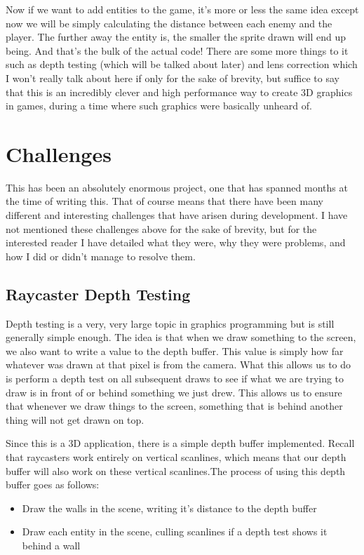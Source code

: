 \documentclass{article}
\begin{document}
Now if we want to add entities to the game, it's more or less the same idea
except now we will be simply calculating the distance between each enemy and the
player. The further away the entity is, the smaller the sprite drawn will end up
being. And that's the bulk of the actual code! There are some more things to it
such as depth testing (which will be talked about later) and lens correction
which I won't really talk about here if only for the sake of brevity, but
suffice to say that this is an incredibly clever and high performance way to
create 3D graphics in games, during a time where such graphics were basically
unheard of.

\section{Challenges}
This has been an absolutely enormous project, one that has spanned months at the
time of writing this. That of course means that there have been many different
and interesting challenges that have arisen during development. I have not
mentioned these challenges above for the sake of brevity, but for the interested
reader I have detailed what they were, why they were problems, and how I did or
didn't manage to resolve them.

\subsection{Raycaster Depth Testing}
Depth testing is a very, very large topic in graphics programming but is still
generally simple enough. The idea is that when we draw something to the screen,
we also want to write a value to the depth buffer. This value is simply how far
whatever was drawn at that pixel is from the camera. What this allows us to do
is perform a depth test on all subsequent draws to see if what we are trying to
draw is in front of or behind something we just drew. This allows us to ensure
that whenever we draw things to the screen, something that is behind another
thing will not get drawn on top.

Since this is a 3D application, there is a simple depth buffer implemented.
Recall that raycasters work entirely on vertical scanlines, which means that our
depth buffer will also work on these vertical scanlines.The process of using
this depth buffer goes as follows:

\begin{itemize}
    \item Draw the walls in the scene, writing it's distance to the depth buffer
    \item Draw each entity in the scene, culling scanlines if a depth test shows it behind a wall
\end{itemize}
\end{document}
